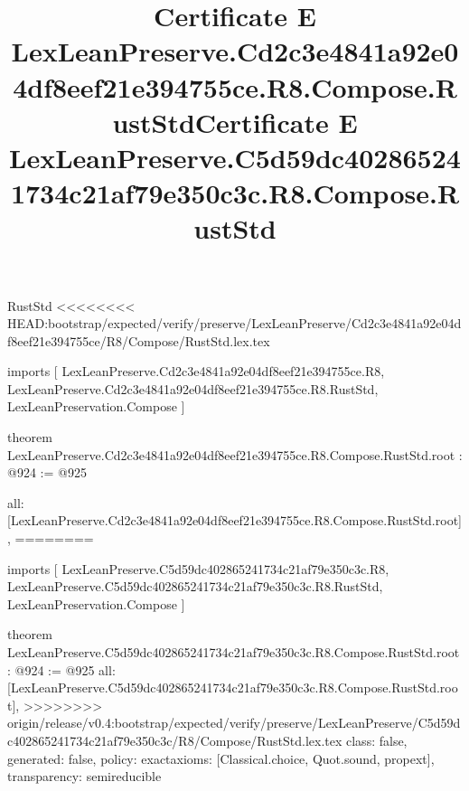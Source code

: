\begin{lexlean}{RustStd}
<<<<<<<< HEAD:bootstrap/expected/verify/preserve/LexLeanPreserve/Cd2c3e4841a92e04df8eef21e394755ce/R8/Compose/RustStd.lex.tex
\title{Certificate E LexLeanPreserve.Cd2c3e4841a92e04df8eef21e394755ce.R8.Compose.RustStd}
\begin{coremodule}
imports [
  LexLeanPreserve.Cd2c3e4841a92e04df8eef21e394755ce.R8,
  LexLeanPreserve.Cd2c3e4841a92e04df8eef21e394755ce.R8.RustStd,
  LexLeanPreservation.Compose
]

theorem LexLeanPreserve.Cd2c3e4841a92e04df8eef21e394755ce.R8.Compose.RustStd.root : @924 := @925 {
  all: [LexLeanPreserve.Cd2c3e4841a92e04df8eef21e394755ce.R8.Compose.RustStd.root],
========
\title{Certificate E LexLeanPreserve.C5d59dc402865241734c21af79e350c3c.R8.Compose.RustStd}
\begin{coremodule}
imports [
  LexLeanPreserve.C5d59dc402865241734c21af79e350c3c.R8,
  LexLeanPreserve.C5d59dc402865241734c21af79e350c3c.R8.RustStd,
  LexLeanPreservation.Compose
]

theorem LexLeanPreserve.C5d59dc402865241734c21af79e350c3c.R8.Compose.RustStd.root : @924 := @925 {
  all: [LexLeanPreserve.C5d59dc402865241734c21af79e350c3c.R8.Compose.RustStd.root],
>>>>>>>> origin/release/v0.4:bootstrap/expected/verify/preserve/LexLeanPreserve/C5d59dc402865241734c21af79e350c3c/R8/Compose/RustStd.lex.tex
  class: false,
  generated: false,
  policy: exact{axioms: [Classical.choice, Quot.sound, propext]},
  transparency: semireducible
}


\end{coremodule}}
\end{coremodule}
\end{lexlean}
